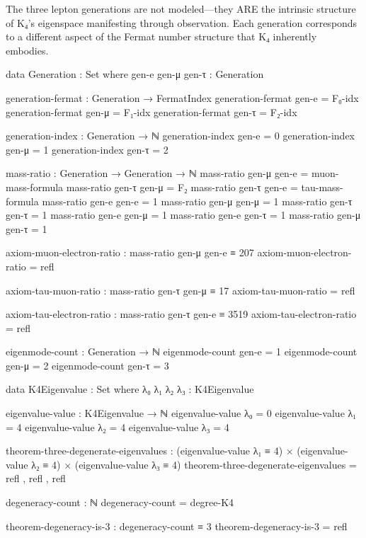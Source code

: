 \documentclass[11pt,a4paper]{book}
\begin{document}
The three lepton generations are not modeled—they ARE the intrinsic structure of K₄'s eigenspace manifesting through observation. Each generation corresponds to a different aspect of the Fermat number structure that K₄ inherently embodies.

\begin{code}
data Generation : Set where
  gen-e gen-μ gen-τ : Generation

generation-fermat : Generation → FermatIndex
generation-fermat gen-e = F₀-idx
generation-fermat gen-μ = F₁-idx
generation-fermat gen-τ = F₂-idx

generation-index : Generation → ℕ
generation-index gen-e = 0
generation-index gen-μ = 1
generation-index gen-τ = 2

mass-ratio : Generation → Generation → ℕ
mass-ratio gen-μ gen-e = muon-mass-formula
mass-ratio gen-τ gen-μ = F₂
mass-ratio gen-τ gen-e = tau-mass-formula
mass-ratio gen-e gen-e = 1
mass-ratio gen-μ gen-μ = 1
mass-ratio gen-τ gen-τ = 1
mass-ratio gen-e gen-μ = 1
mass-ratio gen-e gen-τ = 1
mass-ratio gen-μ gen-τ = 1

axiom-muon-electron-ratio : mass-ratio gen-μ gen-e ≡ 207
axiom-muon-electron-ratio = refl

axiom-tau-muon-ratio : mass-ratio gen-τ gen-μ ≡ 17
axiom-tau-muon-ratio = refl

axiom-tau-electron-ratio : mass-ratio gen-τ gen-e ≡ 3519
axiom-tau-electron-ratio = refl

eigenmode-count : Generation → ℕ
eigenmode-count gen-e = 1
eigenmode-count gen-μ = 2
eigenmode-count gen-τ = 3

data K4Eigenvalue : Set where
  λ₀ λ₁ λ₂ λ₃ : K4Eigenvalue

eigenvalue-value : K4Eigenvalue → ℕ
eigenvalue-value λ₀ = 0
eigenvalue-value λ₁ = 4
eigenvalue-value λ₂ = 4
eigenvalue-value λ₃ = 4

theorem-three-degenerate-eigenvalues :
  (eigenvalue-value λ₁ ≡ 4) ×
  (eigenvalue-value λ₂ ≡ 4) ×
  (eigenvalue-value λ₃ ≡ 4)
theorem-three-degenerate-eigenvalues = refl , refl , refl

degeneracy-count : ℕ
degeneracy-count = degree-K4

theorem-degeneracy-is-3 : degeneracy-count ≡ 3
theorem-degeneracy-is-3 = refl
\end{code}
\end{document}
